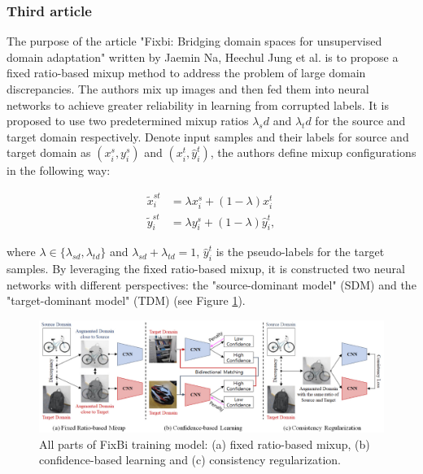 \subsubsection{Third article}

The purpose of the article "Fixbi: Bridging domain spaces for unsupervised domain adaptation" written by Jaemin Na, Heechul Jung et al. \cite{na2021fixbi} is to propose a  fixed ratio-based mixup method to address the problem of large domain discrepancies. The authors mix up images and then fed them into neural networks to achieve greater reliability in learning from corrupted labels. It is proposed to use two predetermined mixup ratios $\lambda_sd$ and $\lambda_td$ for the source and target domain respectively. 
Denote input samples and their labels for source and target domain as $(x_i^s, y_i^s)$ and $(x_i^t, \hat{y}_i^t)$, the authors define mixup configurations in the following way:

\begin{equation*}
\begin{split}
 \tilde{x}^{st}_i &= \lambda x_i^s + (1 - \lambda)x_i^t\\
 \tilde{y}^{st}_i &= \lambda y_i^s + (1 - \lambda)\hat{y}_i^t,
\end{split}
\end{equation*} 

where $\lambda \in \{\lambda_{sd}, \lambda_{td} \}$ and $\lambda_{sd} + \lambda_{td} = 1$, $\hat{y}_i^t$ is the pseudo-labels for the target samples. By leveraging the fixed ratio-based mixup, it is constructed two neural networks with different perspectives: the "source-dominant model" (SDM) and the "target-dominant model" (TDM) (see Figure \ref{fig: fixbi}).

\begin{figure}[H]
    \centering
    \includegraphics[width=\textwidth]{Figures/From articles/fixbi.png}
    \caption{All parts of FixBi training model: (a) fixed ratio-based mixup, (b)
confidence-based learning and (c) consistency regularization.}
    \label{fig: fixbi}
\end{figure}

